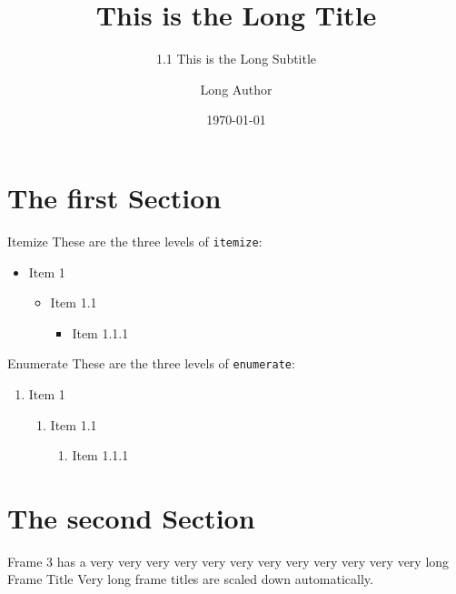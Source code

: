 \documentclass[aspectratio=169]{beamer}
\title[Short Title]{This is the Long Title}
\subtitle[1.1 Short Subtitle]{1.1 This is the Long Subtitle}
\author[Short Author]{Long Author}
\date{\today}
\begin{document}
    
    \maketitle
    
    \section[First Section]{The first Section}

    \begin{frame}{Itemize}
        These are the three levels of \texttt{itemize}:
        \begin{itemize}
            \item Item 1
            \begin{itemize}
                \item Item 1.1
                \begin{itemize}
                    \item Item 1.1.1
                \end{itemize}
            \end{itemize}
        \end{itemize}
    \end{frame}

    \begin{frame}{Enumerate}
        These are the three levels of \texttt{enumerate}:
        \begin{enumerate}
            \item Item 1
            \begin{enumerate}
                \item Item 1.1
                \begin{enumerate}
                    \item Item 1.1.1
                \end{enumerate}
            \end{enumerate}
        \end{enumerate}
    \end{frame}

    \section[Second Section]{The second Section}

    \begin{frame}{Frame 3 has a very very very very very very very very very very very very long Frame Title}
        Very long frame titles are scaled down automatically.
    \end{frame}
\end{document}
